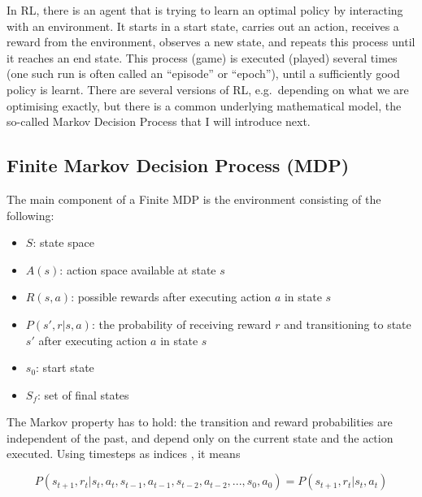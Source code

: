 In RL, there is an agent that is trying to learn an optimal policy by interacting with an environment. It starts in a start state, carries out an action, receives a reward from the environment, observes a new state, and repeats this process until it reaches an end state. This process (game) is executed (played) several times (one such run is often called an ``episode'' or ``epoch''), until a sufficiently good policy is learnt. There are several versions of RL, e.g.\ depending on what we are optimising exactly, but there is a common underlying mathematical model, the so-called Markov Decision Process that I will introduce next.

\subsection{Finite Markov Decision Process (MDP)}


The main component of a Finite MDP is the environment consisting of the following:

\begin{itemize}
    \item 
    $S$: state space
    \item
    $A(s)$: action space available at state $s$
    \item
    $R(s, a)$: possible rewards after executing action $a$ in state $s$
    \item
    $P(s', r | s, a)$: the probability of receiving reward $r$ and transitioning to state $s'$ after executing action $a$ in state $s$
    \item
    $s_0$: start state
    \item
    $S_f$: set of final states
\end{itemize} 


The Markov property has to hold: the transition and reward probabilities are independent of the past, and depend only on the current state and the action executed. Using timesteps as indices , it means

\begin{equation} \label{eq:MarkovProperty}
P(s_{t+1},r_{t} | s_{t}, a_{t}, s_{t-1}, a_{t-1}, s_{t-2}, a_{t-2}, ..., s_{0}, a_{0}) = P(s_{t+1},r_{t} | s_{t}, a_{t})
\end{equation}


